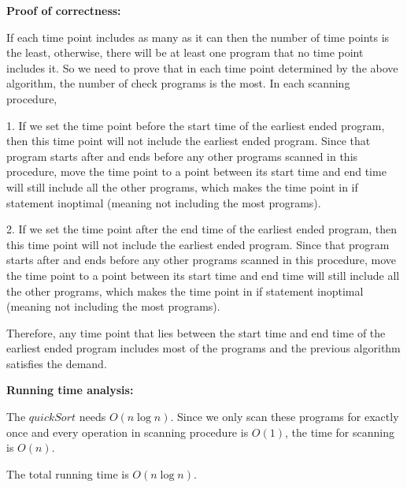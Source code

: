 \documentclass{article}
\begin{document}
{\par\textbf{Proof of correctness: }
\par If each time point includes as many as it can then the number of time points is the least, otherwise, there will be at least one program that no time point includes it. So we need to prove that in each time point determined by the above algorithm, the number of check programs is the most. In each scanning procedure, 
\par 1. If we set the time point before the start time of the earliest ended program, then this time point will not include the earliest ended program. Since that program starts after and ends before any other programs scanned in this procedure, move the time point to a point between its start time and end time will still include all the other programs, which makes the time point in if statement inoptimal (meaning not including the most programs).
\par 2. If we set the time point after the end time of the earliest ended program, then this time point will not include the earliest ended program. Since that program starts after and ends before any other programs scanned in this procedure, move the time point to a point between its start time and end time will still include all the other programs, which makes the time point in if statement inoptimal (meaning not including the most programs).
\par Therefore, any time point that lies between the start time and end time of the earliest ended program includes most of the programs and the previous algorithm satisfies the demand.\\

\par\textbf{Running time analysis: }
\par The $quickSort$ needs $O(n\log n)$. Since we only scan these programs for exactly once and every operation in scanning procedure is $O(1)$, the time for scanning is $O(n)$.
\par The total running time is $O(n\log n)$.
}
\pagebreak
\end{document}
